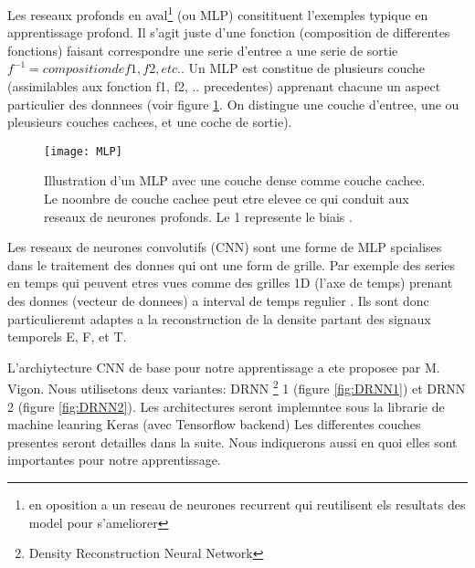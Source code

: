 Les reseaux profonds en aval\footnote{en oposition a un reseau de neurones recurrent qui reutilisent els resultats des model pour s'ameliorer} (ou MLP) consitituent l'exemples typique en apprentissage profond. Il s'agit juste d'une fonction (composition de differentes fonctions) faisant correspondre une serie d'entree a une serie de sortie $f^{-1} = composition de f1, f2, etc.$. Un MLP est constitue de plusieurs couche (assimilables aux fonction f1, f2, .. precedentes) apprenant chacune un aspect particulier des donnnees (voir figure \ref{fig:MLP}. On distingue une couche d'entree, une ou pleusieurs couches cachees, et une coche de sortie).


\begin{figure}[!h]
\centering
\texttt{[image: MLP]} 
\decoRule
\caption[MLP]{Illustration d'un MLP avec une couche dense comme couche cachee. Le noombre de couche cachee peut etre elevee ce qui conduit aux reseaux de neurones profonds. Le 1 represente le biais \parencite[286]{Reference8}.}
\label{fig:MLP}
\end{figure}

Les reseaux de neurones convolutifs (CNN) sont une forme de MLP spcialises dans le traitement des donnes qui ont une form de grille. Par exemple des series en temps qui peuvent etres vues comme des grilles 1D (l'axe de temps) prenant des donnes (vecteur de donnees) a interval de temps regulier \parencite{Reference5}. Ils sont donc particulieremt adaptes a la reconstruction de la densite partant des signaux temporels E, F, et T. 

L'archiytecture CNN de base pour notre apprentissage a ete proposee par M. Vigon. Nous utilisetons deux variantes: DRNN \footnote{Density Reconstruction Neural Network} 1 (figure \ref{fig:DRNN1}) et DRNN 2 (figure \ref{fig:DRNN2}).  Les architectures seront implemntee sous la librarie de machine leanring Keras (avec Tensorflow backend) Les differentes couches presentes seront detailles dans la suite. Nous indiquerons aussi en quoi elles sont importantes pour notre apprentissage.

% 


